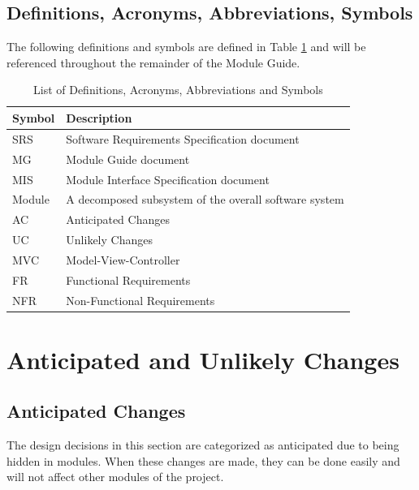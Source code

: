 \documentclass{article}
\begin{document}
\subsection{Definitions, Acronyms, Abbreviations, Symbols}
The following definitions and symbols are defined in Table \ref{TblDFN} and will be referenced throughout the remainder of the Module Guide.
\begin{table}[H]
    \centering
    \begin{tabular}{p{2cm} p{8.5cm}}
        \toprule
        \textbf{Symbol} & \textbf{Description} \\
        \midrule
        SRS & Software Requirements Specification document \\
        MG  & Module Guide document \\
        MIS & Module Interface Specification document \\
        Module & A decomposed subsystem of the overall software system \\
        AC & Anticipated Changes \\
        UC & Unlikely Changes \\
        MVC & Model-View-Controller \\
        FR & Functional Requirements \\
        NFR & Non-Functional Requirements \\
        \bottomrule
    \end{tabular}
    \caption{List of Definitions, Acronyms, Abbreviations and Symbols}
    \label{TblDFN}
\end{table}


\section{Anticipated and Unlikely Changes} \label{SecChange}

\subsection{Anticipated Changes} \label{SecAchange}
The design decisions in this section are categorized as anticipated due to being hidden in modules. When these changes are made, they can be done easily and will not affect other modules of the project.
\end{document}
